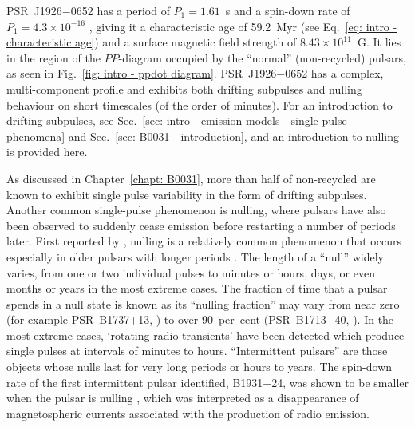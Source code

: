 PSR~J1926$-$0652 has a period of $P_1=1.61$~s and a spin-down rate of $\dot{P_1} = 4.3\times10^{-16}$ \citep{ZLH+2019}, giving it a characteristic age of 59.2~Myr (see Eq.~\eqref{eq: intro - characteristic age}) and a surface magnetic field strength of $8.43\times10^{11}$~G. It lies in the region of the $P\dot{P}$-diagram occupied by the ``normal'' (non-recycled) pulsars, as seen in Fig.~\ref{fig: intro - ppdot diagram}. PSR~J1926$-$0652 has a complex, multi-component profile and exhibits both drifting subpulses and nulling behaviour on short timescales (of the order of minutes). For an introduction to drifting subpulses, see Sec.~\ref{sec: intro - emission models - single pulse phenomena} and Sec.~\ref{sec: B0031 - introduction}, and an introduction to nulling is provided here.

As discussed in Chapter~\ref{chapt: B0031}, more than half of non-recycled are known to exhibit single pulse variability in the form of drifting subpulses. Another common single-pulse phenomenon is nulling, where pulsars have also been observed to suddenly cease emission before restarting a number of periods later. First reported by \citet{Bxxx1970b}, nulling is a relatively common phenomenon that occurs especially in older pulsars with longer periods \citep{Rxxx1986}. The length of a ``null'' widely varies, from one or two individual pulses to minutes or hours, days, or even months or years in the most extreme cases. The fraction of time that a pulsar spends in a null state is known as its ``nulling fraction'' may vary from near zero (for example PSR~B1737+13, \citealt{Bxxx1992}) to over 90~per~cent (PSR~B1713$-$40, \citealt{WMJx2007}). In the most extreme cases, `rotating radio transients' \citep[RRATS;][]{MLL+2006} have been detected which produce single pulses at intervals of minutes to hours. ``Intermittent pulsars'' are those objects whose nulls last for very long periods or hours to years. The spin-down rate of the first intermittent pulsar identified, B1931+24, was shown to be smaller when the pulsar is nulling \citep{KLO+2006}, which was interpreted as a disappearance of magnetospheric currents associated with the production of radio emission.


